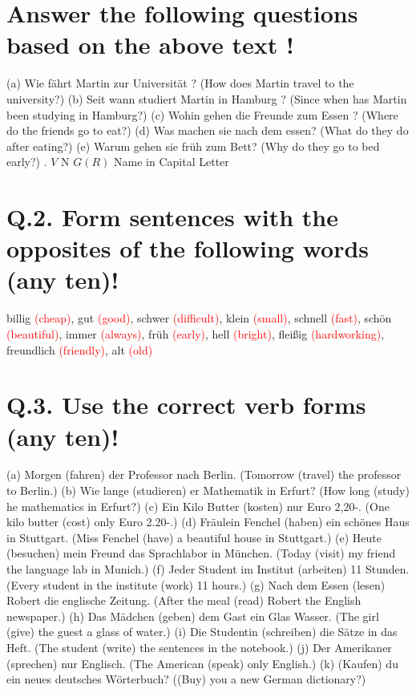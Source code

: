 \documentclass{article}
\begin{document}
\section*{Answer the following questions based on the above text !}
(a) Wie fährt Martin zur Universität ? (How does Martin travel to the university?)
(b) Seit wann studiert Martin in Hamburg ? (Since when has Martin been studying in Hamburg?)
(c) Wohin gehen die Freunde zum Essen ? (Where do the friends go to eat?)
(d) Was machen sie nach dem essen? (What do they do after eating?)
(e) Warum gehen sie früh zum Bett? (Why do they go to bed early?)
. \(V\) N \(G(R)\)
Name in Capital Letter

\section*{Q.2. Form sentences with the opposites of the following words (any ten)!}
billig \textcolor{red}{(cheap)}, gut \textcolor{red}{(good)}, schwer \textcolor{red}{(difficult)}, klein \textcolor{red}{(small)}, schnell \textcolor{red}{(fast)}, schön \textcolor{red}{(beautiful)}, immer \textcolor{red}{(always)}, früh \textcolor{red}{(early)}, hell \textcolor{red}{(bright)}, fleißig \textcolor{red}{(hardworking)}, freundlich \textcolor{red}{(friendly)}, alt \textcolor{red}{(old)}
\section*{Q.3. Use the correct verb forms (any ten)!}
(a) Morgen (fahren) der Professor nach Berlin. (Tomorrow (travel) the professor to Berlin.)
(b) Wie lange (studieren) er Mathematik in Erfurt? (How long (study) he mathematics in Erfurt?)
(c) Ein Kilo Butter (kosten) nur Euro 2,20-. (One kilo butter (cost) only Euro 2.20-.)
(d) Fräulein Fenchel (haben) ein schönes Haus in Stuttgart. (Miss Fenchel (have) a beautiful house in Stuttgart.)
(e) Heute (besuchen) mein Freund das Sprachlabor in München. (Today (visit) my friend the language lab in Munich.)
(f) Jeder Student im Institut (arbeiten) 11 Stunden. (Every student in the institute (work) 11 hours.)
(g) Nach dem Essen (lesen) Robert die englische Zeitung. (After the meal (read) Robert the English newspaper.)
(h) Das Mädchen (geben) dem Gast ein Glas Wasser. (The girl (give) the guest a glass of water.)
(i) Die Studentin (schreiben) die Sätze in das Heft. (The student (write) the sentences in the notebook.)
(j) Der Amerikaner (sprechen) nur Englisch. (The American (speak) only English.)
(k) (Kaufen) du ein neues deutsches Wörterbuch? ((Buy) you a new German dictionary?)
\end{document}
